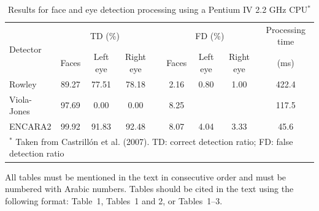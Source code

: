 \documentclass[twoside,twocolumn]{article}
\begin{document}
\begin{table}[thp]\footnotesize
\centering
\caption{Results for face and eye detection processing using a Pentium IV 2.2 GHz CPU$^\textbf{*}$ \citep{Deniz10}} \label{Table:FacesDetected}
\addtolength{\tabcolsep}{4.8pt}
\begin{tabular*}{16.4cm}{lcccccccc}
	\toprule[0.75pt]
	\multirow{2}{*}{Detector}                  & \multicolumn{3}{c}{TD (\%)}  &  & \multicolumn{3}{c}{FD (\%)}  & \multicolumn{1}{c}{Processing time} \\
	\cmidrule[0.5pt]{2-4}\cmidrule[0.5pt]{6-8} & Faces & Left eye & Right eye &  & Faces & Left eye & Right eye &                (ms)                 \\ 
	\midrule[0.5pt]
	Rowley                                     & 89.27 &  77.51   &   78.18   &  & 2.16  &   0.80   &   1.00    &                422.4                \\
	Viola-Jones                                & 97.69 &   0.00   &   0.00    &  & 8.25  &          &           &                117.5                \\
	ENCARA2                                    & 99.92 &  91.83   &   92.48   &  & 8.07  &   4.04   &   3.33    &                45.6                 \\ 
	\bottomrule[0.75pt]
	\multicolumn{9}{p{15.6cm}}{\scriptsize $^*$ Taken from Castrill\'{o}n {et al}. (2007). TD: correct detection ratio; FD: false detection ratio}
\end{tabular*}
\end{table}


All tables must be mentioned in the text in consecutive order and must be numbered with Arabic numbers. Tables should be cited in the text using the following format: Table~1, Tables~1 and 2, or Tables~1--3.
\end{document}
